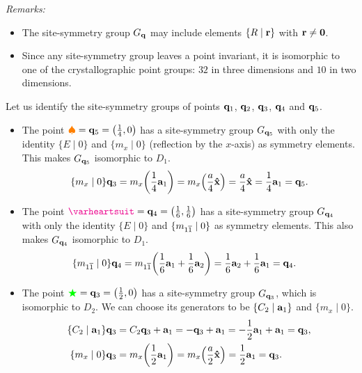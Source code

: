 \textit{Remarks:}
\begin{itemize}
\item The site-symmetry group \( G_{\vb{q}} \) may include elements \(\{R \mid {\vb{r}}\}\) with \({\vb{r}} \neq {\vb{0}}\).
\item Since any site-symmetry group leaves a point invariant, it is isomorphic to one of the crystallographic point groups: $32$ in three dimensions and $10$ in two dimensions.

\end{itemize}

\begin{example} \label{ex:site-symmetry_groups_p6mm}
Let us identify the site-symmetry groups of points ${\vb{q}}_1$, ${\vb{q}}_2$, ${\vb{q}}_3$, ${\vb{q}}_4$ and ${\vb{q}}_5$.

\begin{itemize}
\item The point $\textcolor{orange}{\spadesuit} = {\vb{q}}_5 = \qty(\frac{1}{4}, 0)$ has a site-symmetry group \(G_{{\vb{q}}_5}\) with only the identity $\{E \mid 0\}$ and $\{m_{x} \mid 0\}$ (reflection by the $x$-axis) as symmetry elements. This makes $G_{{\vb{q}}_5}$ isomorphic to $D_1$.
\begin{equation} \label{eq:site-symmetry-q5}
\{m_{x} \mid 0\} {\vb{q}}_3 = m_x \qty(\frac{1}{4} {\vb{a}}_1) = m_x \qty(\frac{a}{4} \vu{x}) = \frac{a}{4} \vu{x} = \frac{1}{4} {\vb{a}}_1 = {\vb{q}}_5.
\end{equation}


\item The point \(\textcolor{magenta}{\varheartsuit} = \q_4 = \qty(\frac{1}{6}, \frac{1}{6})\) has a site-symmetry group \(G_{{\vb{q}}_4}\) with only the identity $\{E \mid 0\}$ and $\{m_{1\overline{1}} \mid 0\}$ as symmetry elements. This also makes $G_{{\vb{q}}_4}$ isomorphic to $D_1$.
\begin{align} \label{eq:site-symmetry-q4}
\{m_{1\overline{1}} \mid 0\} {\vb{q}}_4 &= m_{1\overline{1}}\qty(\frac{1}{6} {\vb{a}}_1 + \frac{1}{6} {\vb{a}}_2) = \frac{1}{6} {\vb{a}}_2 + \frac{1}{6} {\vb{a}}_1 = {\vb{q}}_4.
\end{align}

\item The point \(\textcolor{green}{\bigstar} = {\vb{q}}_3 = \qty(\frac{1}{2}, 0)\) has a site-symmetry group \(G_{{\vb{q}}_3}\), which is isomorphic to \(D_2\). We can choose its generators to be $\{C_2 \mid {\vb{a}}_1\}$ and $\{m_{x}\mid 0\}$.
\begin{align} \label{eq:site-symmetry-q3}
\{C_2 \mid {\vb{a}}_1\} {\vb{q}}_3 &= C_2 {\vb{q}}_3 + {\vb{a}}_1 = -{\vb{q}}_3 + {\vb{a}}_1 = -\frac{1}{2} {\vb{a}}_1 + {\vb{a}}_1 = {\vb{q}}_3, \\
\{m_{x} \mid 0\} {\vb{q}}_3 &= m_x \qty(\frac{1}{2} {\vb{a}}_1) = m_x \qty(\frac{a}{2} \vu{x}) = \frac{1}{2} {\vb{a}}_1 = {\vb{q}}_3.
\end{align}


\end{itemize}
\end{example}
